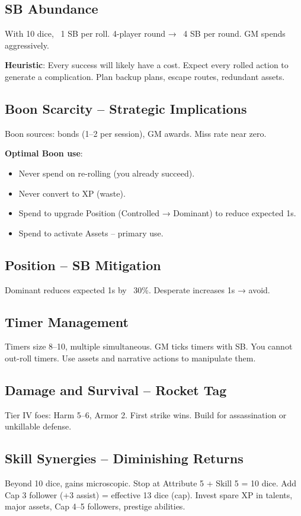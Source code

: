 \documentclass[11pt]{article}
\begin{document}
\subsection{SB Abundance}
With 10 dice, ~1 SB per roll. 4-player round → ~4 SB per round. GM spends aggressively.

\textbf{Heuristic}: Every success will likely have a cost. Expect every rolled action to generate a complication. Plan backup plans, escape routes, redundant assets.

\subsection{Boon Scarcity – Strategic Implications}
Boon sources: bonds (1–2 per session), GM awards. Miss rate near zero.

\textbf{Optimal Boon use}:
\begin{itemize}
    \item Never spend on re-rolling (you already succeed).
    \item Never convert to XP (waste).
    \item Spend to upgrade Position (Controlled → Dominant) to reduce expected 1s.
    \item Spend to activate Assets – primary use.
\end{itemize}

\subsection{Position – SB Mitigation}
Dominant reduces expected 1s by ~30\%. Desperate increases 1s → avoid.

\subsection{Timer Management}
Timers size 8–10, multiple simultaneous. GM ticks timers with SB. You cannot out-roll timers. Use assets and narrative actions to manipulate them.

\subsection{Damage and Survival – Rocket Tag}
Tier IV foes: Harm 5–6, Armor 2. First strike wins. Build for assassination or unkillable defense.

\subsection{Skill Synergies – Diminishing Returns}
Beyond 10 dice, gains microscopic. Stop at Attribute 5 + Skill 5 = 10 dice. Add Cap 3 follower (+3 assist) = effective 13 dice (cap). Invest spare XP in talents, major assets, Cap 4–5 followers, prestige abilities.
\end{document}
